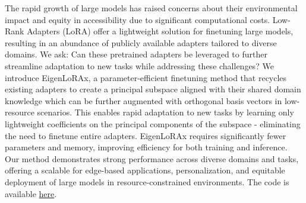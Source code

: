 The rapid growth of large models has raised concerns about their environmental impact and equity in accessibility due to significant computational costs. Low-Rank Adapters (LoRA) offer a lightweight solution for finetuning large models, resulting in an abundance of publicly available adapters tailored to diverse domains. We ask: Can these pretrained adapters be leveraged to further streamline adaptation to new tasks while addressing these challenges? We introduce EigenLoRAx, a parameter-efficient finetuning method that recycles existing adapters to create a principal subspace aligned with their shared domain knowledge which can be further augmented with orthogonal basis vectors in low-resource scenarios. This enables rapid adaptation to new tasks by learning only lightweight coefficients on the principal components of the subspace - eliminating the need to finetune entire adapters. EigenLoRAx requires significantly fewer parameters and memory, improving efficiency for both training and inference. Our method demonstrates strong performance across diverse domains and tasks, offering a scalable for edge-based applications, personalization, and equitable deployment of large models in resource-constrained environments. The code is available \href{https://github.com/toshi2k2/EigenLoRA/}{here}.